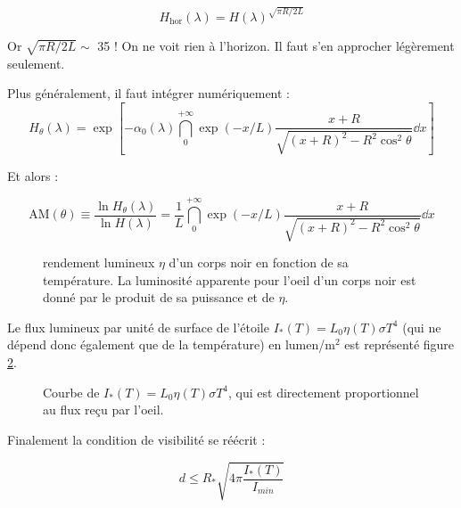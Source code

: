 \documentclass[11pt]{article} %
\begin{document}
\begin{equation}
H_{\mbox{hor}}(\lambda) = H(\lambda)^{\sqrt{\pi R/2L}}
\end{equation}

Or $\sqrt{\pi R/2L} \sim $ 35 ! On ne voit rien à l'horizon. Il faut s'en approcher légèrement seulement.

Plus généralement, il faut intégrer numériquement :
\begin{equation}
H_\theta(\lambda) = \exp \left [ -\alpha_0(\lambda) \dint_0^{+\infty}\exp(-x/L) \dfrac{x + R}{\sqrt{(x+R)^2 -  R^2\cos^2 \theta }} \dd x\right ] 
\end{equation}

Et alors :

\begin{equation}
\mbox{AM}(\theta) \equiv \dfrac{\ln H_\theta(\lambda)}{\ln H(\lambda)} = \dfrac{1}{L}\dint_0^{+\infty}\exp(-x/L) \dfrac{x + R}{\sqrt{(x+R)^2 -  R^2\cos^2 \theta }} \dd x
\end{equation}


\begin{figure}[H]
\centering
  \caption{rendement lumineux $\eta$ d'un corps noir en fonction de sa température. La luminosité apparente pour l'oeil d'un corps noir est donné par le produit de sa puissance et de $\eta$. 
\label{fig:eta}}

\end{figure}

Le flux lumineux par unité de surface de l'étoile $I_*(T) = L_0 \eta(T) \sigma T^4$ (qui ne dépend donc également que de la température) en lumen/m$^2$ est représenté figure \ref{fig:eta_t4}. 

\begin{figure}[H]
\centering
  \caption{Courbe de $I_*(T) = L_0 \eta(T) \sigma T^4$, qui est directement proportionnel au flux reçu par l'oeil.
\label{fig:eta_t4}}

\end{figure}

Finalement la condition de visibilité se réécrit :

\begin{equation}
 d \leq R_{*} \sqrt{4\pi\dfrac{I_*(T)}{I_{min}}}
\end{equation}
\end{document}
